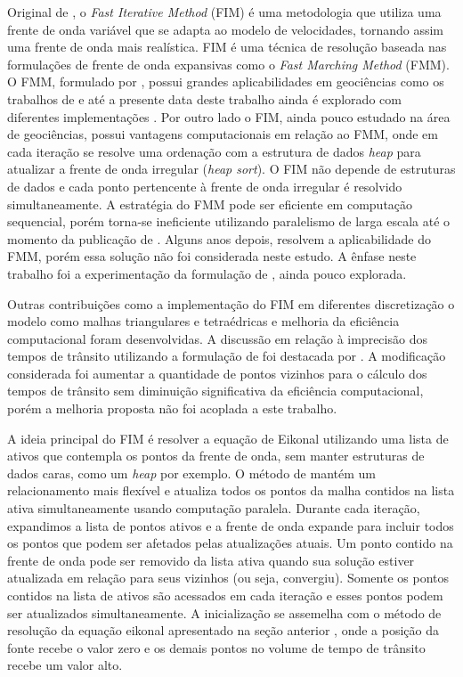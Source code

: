 Original de , o \textit{Fast Iterative Method} (FIM) é uma metodologia que utiliza uma frente de onda variável que se adapta ao modelo de velocidades, tornando assim uma frente de onda mais realística. FIM é uma técnica de resolução baseada nas formulações de frente de onda expansivas como o \textit{Fast Marching Method} (FMM). O FMM, formulado por , possui grandes aplicabilidades em geociências como os trabalhos de  e até a presente data deste trabalho ainda é explorado com diferentes implementações \cite{white2020pykonal, chenpyekfmm2023}. Por outro lado o FIM, ainda pouco estudado na área de geociências, possui vantagens computacionais em relação ao FMM, onde em cada iteração se resolve uma ordenação com a estrutura de dados \textit{heap} para atualizar a frente de onda irregular (\textit{heap sort}). O FIM não depende de estruturas de dados e cada ponto pertencente à frente de onda irregular é resolvido simultaneamente. A estratégia do FMM pode ser eficiente em computação sequencial, porém torna-se ineficiente utilizando paralelismo de larga escala até o momento da publicação de . Alguns anos depois,  resolvem a aplicabilidade do FMM, porém essa solução não foi considerada neste estudo. A ênfase neste trabalho foi a experimentação da formulação de , ainda pouco explorada. 

Outras contribuições como a implementação do FIM em diferentes discretização o modelo como malhas triangulares e tetraédricas \cite{fu2011fast, fu2013fast} e melhoria da eficiência computacional \cite{dang2014fast, hong2016multi, hong2022mg} foram desenvolvidas. A discussão em relação à imprecisão dos tempos de trânsito utilizando a formulação de  foi destacada por . A modificação considerada foi aumentar a quantidade de pontos vizinhos para o cálculo dos tempos de trânsito sem diminuição significativa da eficiência computacional, porém a melhoria proposta não foi acoplada a este trabalho. 

A ideia principal do FIM é resolver a equação de Eikonal utilizando uma lista de ativos que contempla os pontos da frente de onda, sem manter estruturas de dados caras, como um \textit{heap} por exemplo. O método de \cite{jeong2008fast} mantém um
relacionamento mais flexível e atualiza todos os pontos da malha contidos na lista ativa simultaneamente usando computação paralela. Durante cada iteração, expandimos a lista de pontos ativos e a frente de onda expande para incluir todos os pontos que podem ser afetados pelas atualizações atuais.  Um ponto contido na frente de onda pode ser removido da lista ativa quando sua solução estiver atualizada em relação para seus vizinhos (ou seja, convergiu). Somente os pontos contidos na lista de ativos são acessados em cada iteração e esses pontos podem ser atualizados simultaneamente. A inicialização se assemelha com o método de resolução da equação eikonal apresentado na seção anterior \cite{podvin1991finite}, onde a posição da fonte recebe o valor zero e os demais pontos no volume de tempo de trânsito recebe um valor alto.

